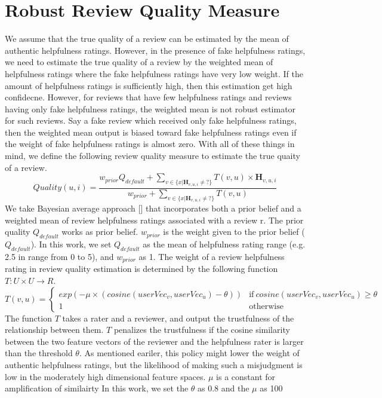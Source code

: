 \documentclass[master,english,final]{kaist-ucs}
\begin{document}
\section{Robust Review Quality Measure}

We assume that the true quality of a review can be estimated by the mean of authentic helpfulness ratings.
However, in the presence of fake helpfulness ratings, we need to estimate the true quality of a review by the weighted mean of helpfulness ratings where the fake helpfulness ratings have very low weight.
If the amount of helpfulness ratings is sufficiently high, then this estimation get high confidecne.
However, for reviews that have few helpfulness ratings and reviews having only fake helpfulness ratings, the weighted mean is not robust estimator for such reviews.
Say a fake review which received only fake helpfulness ratings, then the weighted mean output is biased toward fake helpfulness ratings even if the weight of fake helpfulness ratings is almost zero.
With all of these things in mind, we define the following review quality measure to estimate the true quaity of a review.
\begin{equation}
Quality(u,i) = \frac{ w_{prior} Q_{default} + \sum_{v \in \{x|\bm{H}_{v,u,i} \neq ?\}} T(v,u) \times \bm{H}_{v,u,i} } {w_{prior}  + \sum_{v \in \{x|\bm{H}_{v,u,i} \neq ?\}} T(v,u) }
\end{equation}
We take Bayesian average approach [] that incorporates both a prior belief and a weighted mean of review helpfulness ratings associated with a review r.
The prior quality $Q_{default}$ works as prior belief. $w_{prior}$ is the weight given to the prior belief ($Q_{default}$).
In this work, we set $Q_{default}$ as the mean of helpfulness rating range (e.g. 2.5 in range from 0 to 5), and $w_{prior}$ as 1.
The weight of a review helpfulness rating in review quality estimation is determined by the following function $T: U \times U \rightarrow R$.
\begin{equation}
T(v,u)=
\begin{cases}
  exp(-\mu \times(cosine(userVec_v,userVec_u)-\theta)) & \text{if}\ cosine(userVec_v,userVec_u) \geq \theta \\
  1 & \text{otherwise}
\end{cases}
\end{equation}
The function $T$ takes a rater and a reviewer, and output the trustfulness of the relationship between them.
$T$ penalizes the trustfulness if the cosine similarity between the two feature vectors of the reviewer and the helpfulness rater is larger than the threshold $\theta$.
As mentioned eariler, this policy might lower the weight of authentic helpfulness ratings, but the likelihood of making such a misjudgment is low in the moderately high dimensional feature spaces.
$\mu$ is a constant for amplification of similairty
In this work, we set the $\theta$ as 0.8 and the $\mu$ as 100
\end{document}
